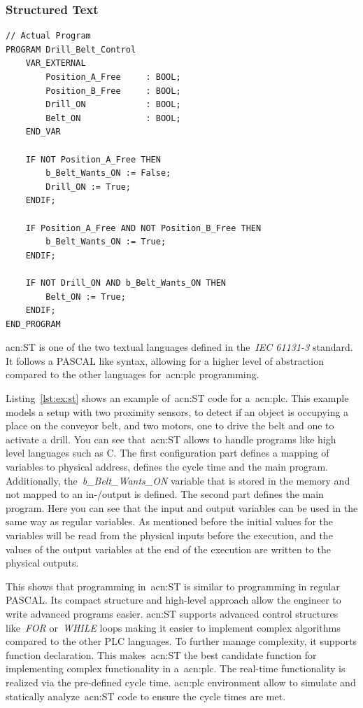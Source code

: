 \subsubsection{Structured Text}
\lstset{language=Pascal}
\begin{lstlisting}[caption={
Example of~\gls{acn:ST} code for controlling a conveyor belt and a drill.},label=lst:ex:st]
// Actual Program
PROGRAM Drill_Belt_Control          
	VAR_EXTERNAL
		Position_A_Free     : BOOL;
		Position_B_Free     : BOOL;
		Drill_ON            : BOOL;
		Belt_ON             : BOOL;
	END_VAR

	IF NOT Position_A_Free THEN
		b_Belt_Wants_ON := False;
		Drill_ON := True;
	ENDIF;

	IF Position_A_Free AND NOT Position_B_Free THEN
		b_Belt_Wants_ON := True;
	ENDIF;

	IF NOT Drill_ON AND b_Belt_Wants_ON THEN
		Belt_ON := True;
	ENDIF;
END_PROGRAM
\end{lstlisting}

\acrfull{acn:ST} is one of the two textual languages defined in the~\textit{IEC 61131-3} standard.
It follows a PASCAL like syntax, allowing for a higher level of abstraction compared to the other languages for~\acrshort{acn:plc} programming.

Listing~\ref{lst:ex:st} shows an example of~\acrshort{acn:ST} code for a~\acrshort{acn:plc}.
This example models a setup with two proximity sensors, to detect if an object is occupying a place on the conveyor belt, and two motors, one to drive the belt and one to activate a drill.
You can see that~\acrshort{acn:ST} allows to handle programs like high level languages such as C.
The first configuration part defines a mapping of variables to physical address, defines the cycle time and the main program.
Additionally, the~\textit{b\_Belt\_Wants\_ON} variable that is stored in the memory and not mapped to an in-/output is defined.
The second part defines the main program.
Here you can see that the input and output variables can be used in the same way as regular variables.
As mentioned before the initial values for the variables will be read from the physical inputs before the execution, and the values of the output variables at the end of the execution are written to the physical outputs.

This shows that programming in~\acrshort{acn:ST} is similar to programming in regular PASCAL.
Its compact structure and high-level approach allow the engineer to write advanced programs easier.
\acrshort{acn:ST} supports advanced control structures like~\textit{FOR} or~\textit{WHILE} loops making it easier to implement complex algorithms compared to the other PLC languages. 
To further manage complexity, it supports function declaration.
This makes~\acrshort{acn:ST} the best candidate function for implementing complex functionality in a~\acrshort{acn:plc}.
The real-time functionality is realized via the pre-defined cycle time.
\acrshort{acn:plc} environment allow to simulate and statically analyze~\acrshort{acn:ST} code to ensure the cycle times are met.

